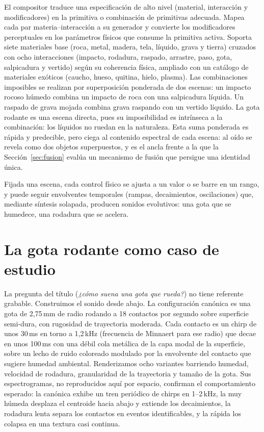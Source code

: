 \documentclass[a4paper,11pt,twoside]{article}
\begin{document}
El compositor traduce una especificación de alto nivel (material, interacción y modificadores) en la primitiva o combinación de primitivas adecuada. Mapea cada par materia--interacción a su generador y convierte los modificadores perceptuales en los parámetros físicos que consume la primitiva activa. Soporta siete materiales base (roca, metal, madera, tela, líquido, grava y tierra) cruzados con ocho interacciones (impacto, rodadura, raspado, arrastre, paso, gota, salpicadura y vertido) según su coherencia física, ampliado con un catálogo de materiales exóticos (caucho, hueso, quitina, hielo, plasma). Las combinaciones imposibles se realizan por superposición ponderada de dos escenas: un impacto rocoso húmedo combina un impacto de roca con una salpicadura líquida. Un raspado de grava mojada combina grava raspando con un vertido líquido. La gota rodante es una escena directa, pues su imposibilidad es intrínseca a la combinación: los líquidos no ruedan en la naturaleza. Esta suma ponderada es rápida y predecible, pero ciega al contenido espectral de cada escena: al oído se revela como dos objetos superpuestos, y es el ancla frente a la que la Sección~\ref{sec:fusion} evalúa un mecanismo de fusión que persigue una identidad única.

Fijada una escena, cada control físico se ajusta a un valor o se barre en un rango, y puede seguir envolventes temporales (rampas, decaimientos, oscilaciones) que, mediante síntesis solapada, producen sonidos evolutivos: una gota que se humedece, una rodadura que se acelera.

\section{La gota rodante como caso de estudio}

La pregunta del título (\emph{¿cómo suena una gota que rueda?}) no tiene referente grabable. Construimos el sonido desde abajo. La configuración canónica es una gota de 2,75\,mm de radio rodando a 18 contactos por segundo sobre superficie semi-dura, con rugosidad de trayectoria moderada. Cada contacto es un chirp de unos 30\,ms en torno a 1,2\,kHz (frecuencia de Minnaert para ese radio) que decae en unos 100\,ms con una débil cola metálica de la capa modal de la superficie, sobre un lecho de ruido coloreado modulado por la envolvente del contacto que sugiere humedad ambiental. Renderizamos ocho variantes barriendo humedad, velocidad de rodadura, granularidad de la trayectoria y tamaño de la gota. Sus espectrogramas, no reproducidos aquí por espacio, confirman el comportamiento esperado: la canónica exhibe un tren periódico de chirps en 1--2\,kHz, la muy húmeda desplaza el centroide hacia abajo y extiende los decaimientos, la rodadura lenta separa los contactos en eventos identificables, y la rápida los colapsa en una textura casi continua.
\end{document}
